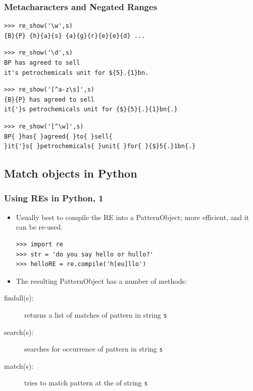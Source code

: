 \begin{frame}[fragile]
\frametitle{Metacharacters and Negated Ranges}


\begin{verbatim}
>>> re_show('\w',s)
{B}{P} {h}{a}{s} {a}{g}{r}{e}{e}{d} ...
\end{verbatim}

\begin{verbatim}
>>> re_show('\d',s)
BP has agreed to sell
it's petrochemicals unit for ${5}.{1}bn.
\end{verbatim}

\begin{verbatim}
>>> re_show('[^a-z\s]',s)
{B}{P} has agreed to sell
it{'}s petrochemicals unit for {$}{5}{.}{1}bn{.}
\end{verbatim}

\begin{verbatim}
>>> re_show('[^\w]',s)
BP{ }has{ }agreed{ }to{ }sell{
}it{'}s{ }petrochemicals{ }unit{ }for{ }{$}5{.}1bn{.}
\end{verbatim}
\end{frame}

\subsection{Match objects in Python}

\begin{frame}[fragile]
\frametitle{Using REs in Python, 1}

\begin{itemize}
\item Usually best to compile the RE into a PatternObject; more
  efficient, and it can be re-used.
\begin{verbatim}
>>> import re
>>> str = 'do you say hello or hullo?'
>>> helloRE = re.compile('h[eu]llo')
\end{verbatim}
\item The resulting PatternObject has a number of methods:
\end{itemize}
\begin{description}
  \item [findall(s):] returns a list of  matches of pattern in string \texttt{s}
  \item [search(s):] searches for  occurrence of pattern in string \texttt{s}
  \item [match(s):] tries to match pattern at the  of string \texttt{s}
\end{description}

\end{frame}

